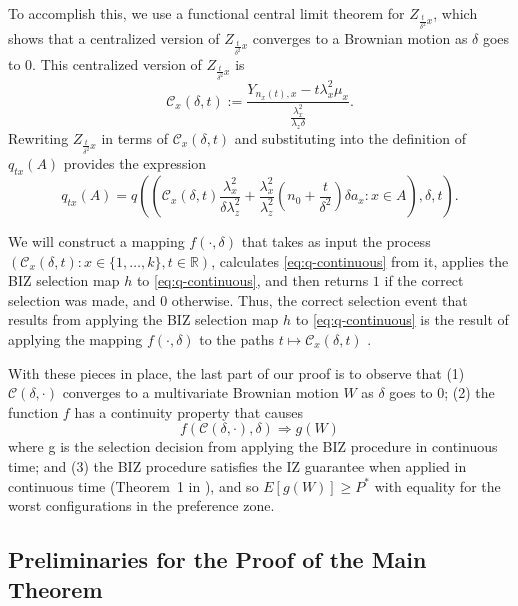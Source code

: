 \documentclass{wscpaperproc}
\theoremstyle{wsc}
\begin{document}
To accomplish this, we use a functional central limit theorem for
$Z_{\frac{t}{\delta^{2}}x}$, which shows that a centralized
version of $Z_{\frac{t}{\delta^{2}}x}$ converges to a Brownian motion as $\delta$ goes to $0$.
This centralized version of $Z_{\frac{t}{\delta^{2}}x}$ is 
\[
\mathcal{C}_{x}\left(\delta,t\right):=\frac{Y_{n_{x}\left(t\right),x}-t\lambda_{x}^{2}\mu_{x}}{\frac{\lambda_{x}^{2}}{\lambda_{z}\delta}}.
\]
Rewriting $Z_{\frac{t}{\delta^{2}}x}$ in terms of $\mathcal{C}_{x}\left(\delta,t\right)$ and substituting into the definition of $q_{tx}(A)$ provides the expression
\begin{equation}
    q_{tx}\left(A\right)=q\left(\left(\mathcal{C}_{x}\left(\delta,t\right)\frac{\lambda_{x}^{2}}{\delta\lambda_{z}^{2}}+\frac{\lambda_{x}^{2}}{\lambda_{z}^{2}}\left(n_{0}+\frac{t}{\delta^{2}}\right)\delta a_{x}:x\in A\right),\delta,t \right).
    \label{eq:q}
\end{equation}

We will construct a mapping $f\left(\cdot,\delta\right)$ that takes as input the process
$\left(\mathcal{C}_{x}\left(\delta,t\right) : x\in \{1,\ldots,k\}, t\in\mathbb{R}\right)$,
calculates 
\eqref{eq:q-continuous}
from it,
applies the BIZ selection map $h$ to \eqref{eq:q-continuous}, 
and then returns $1$ if the correct selection was made,
and $0$ otherwise.
Thus, the correct selection event that results from applying
the BIZ selection map $h$ to \eqref{eq:q-continuous} is the result
of applying the mapping $f\left(\cdot,\delta\right)$
to the paths $t\mapsto\mathcal{C}_{x}\left(\delta,t\right)$ .



With these pieces in place, the last part of our proof is to observe that (1) $\mathcal{C}\left(\delta,\cdot\right)$
converges to a multivariate Brownian motion $W$ as $\delta$ goes
to 0; (2) the function $f$ has a continuity property that causes
\[
f\left(\mathcal{C}\left(\delta,\cdot\right),\delta\right)\Rightarrow g\left(W\right)
\]
where g is the selection decision from applying the BIZ procedure
in continuous time; and (3) the BIZ procedure satisfies the IZ guarantee
when applied in continuous time (Theorem~1 in ), and so $E[g(W)] \ge P^*$ with equality for the worst configurations in the preference zone.

\subsection{Preliminaries for the Proof of the Main Theorem}
\end{document}
